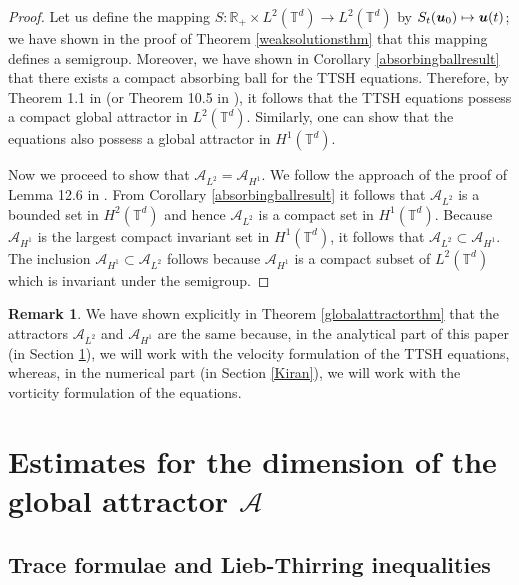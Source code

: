 \documentclass[11pt]{amsart}
\newcommand{\bu}{\mbox{\boldmath$u$}}
\newcommand{\Att}{\mathcal{A}}
\theoremstyle{definition}
\newtheorem{remark}[proposition]{Remark}
\numberwithin{equation}{section}
\numberwithin{equation}{section}
\begin{document}
\begin{proof}
Let us define the mapping $S : \mathbb{R}_+ \times L^2 (\mathbb{T}^d) \rightarrow L^2 (\mathbb{T}^d)$ by $S_t (\bu_0) \mapsto \bu (t)$; we have shown in the proof of Theorem \ref{weaksolutionsthm} that this mapping defines a semigroup. Moreover, we have shown in Corollary \ref{absorbingballresult} that there exists a compact absorbing ball for the TTSH equations. Therefore, by Theorem 1.1 in \cite[Chapter 1]{temam1997} (or Theorem 10.5 in \cite{robinson2001}), it follows that the TTSH equations possess a compact global attractor in $L^2 (\mathbb{T}^d)$. Similarly, one can show that the equations also possess a global attractor in $H^1 (\mathbb{T}^d)$.
\par\smallskip%
Now we proceed to show that $\Att_{L^2} = \Att_{H^1}$. We follow the approach of the proof of Lemma 12.6 in \cite{robinson2001}. From Corollary \ref{absorbingballresult} it follows that $\Att_{L^2}$ is a bounded set in $H^2 (\mathbb{T}^d)$ and hence $\Att_{L^2}$ is a compact set in $H^1 (\mathbb{T}^d)$. Because $\Att_{H^1}$ is the largest compact invariant set in $H^1 (\mathbb{T}^d)$, it follows that $\Att_{L^2} \subset \Att_{H^1}$. The inclusion $\Att_{H^1} \subset \Att_{L^2}$ follows because $\Att_{H^1}$ is a compact subset of $L^2 (\mathbb{T}^d)$ which is invariant under the semigroup.
\end{proof}
\begin{remark}
We have shown explicitly in Theorem \ref{globalattractorthm} that the attractors $\Att_{L^2}$ and $\Att_{H^1}$ are the same because, in the analytical part of this paper (in Section \ref{sect:3}), we will work with the velocity formulation of the TTSH equations, whereas, in the numerical part (in Section \ref{Kiran}), we will work with the vorticity formulation of the equations.
\end{remark}

\section{\large Estimates for the dimension of the global attractor $\Att$}\label{sect:3}

\subsection{Trace formulae and Lieb-Thirring inequalities}\label{LTin}
\end{document}
